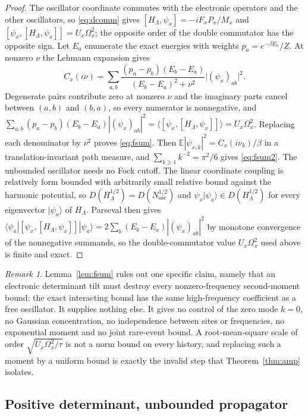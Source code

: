 \documentclass[11pt]{article}
\theoremstyle{definition}
\theoremstyle{remark}
\newtheorem{remark}[theorem]{Remark}
\newcommand{\E}{\mathbb{E}}
\begin{document}
\begin{proof}
The oscillator coordinate commutes with the electronic operators and the other
oscillators, so \eqref{eq:dcomm} gives $[H_\Lambda,\psi_x]=-iF_xP_x/M_x$ and
$[\psi_x,[H_\Lambda,\psi_x]]=U_x\Omega_x^2$; the opposite order of the double
commutator has the opposite sign. Let $E_a$ enumerate the exact energies with weights
$p_a=e^{-\beta E_a}/Z$. At nonzero $\nu$ the Lehmann expansion gives
\begin{equation}
C_x(i\nu)=\sum_{a,b}\frac{(p_a-p_b)(E_b-E_a)}{(E_b-E_a)^2+\nu^2}
\bigl|(\psi_x)_{ab}\bigr|^2 .
\label{eq:lehmann}
\end{equation}
Degenerate pairs contribute zero at nonzero $\nu$ and the imaginary parts cancel
between $(a,b)$ and $(b,a)$, so every numerator is nonnegative, and
$\sum_{a,b}(p_a-p_b)(E_b-E_a)|(\psi_x)_{ab}|^2
=\langle[\psi_x,[H_\Lambda,\psi_x]]\rangle=U_x\Omega_x^2$. Replacing each denominator
by $\nu^2$ proves \eqref{eq:fsum}. Then
$\E|\psi_{x,k}|^2=C_x(i\nu_k)/\beta$ in a translation-invariant path measure, and
$\sum_{k\ge1}k^{-2}=\pi^2/6$ gives \eqref{eq:fsum2}. The unbounded oscillator needs no
Fock cutoff. The linear coordinate coupling is relatively form bounded with
arbitrarily small relative bound against the harmonic potential, so
$D(H_\Lambda^{1/2})=D(N_{\mathrm{osc}}^{1/2})$ and $\psi_x|\psi_a\rangle\in
D(H_\Lambda^{1/2})$ for every eigenvector $|\psi_a\rangle$ of $H_\Lambda$. Parseval
then gives
$\langle\psi_a|[\psi_x,[H_\Lambda,\psi_x]]|\psi_a\rangle
=2\sum_b(E_b-E_a)|(\psi_x)_{ab}|^2$ by monotone convergence of the nonnegative
summands, so the double-commutator value $U_x\Omega_x^2$ used above is finite and
exact.
\end{proof}

\begin{remark}
Lemma~\ref{lem:fsum} rules out one specific claim, namely that an electronic
determinant tilt must destroy every nonzero-frequency second-moment bound: the exact
interacting bound has the same high-frequency coefficient as a free oscillator. It
supplies nothing else. It gives no control of the zero mode $k=0$, no Gaussian
concentration, no independence between sites or frequencies, no exponential moment
and no joint rare-event bound. A root-mean-square scale of order
$\sqrt{U_x\Omega_x^2/\tau}$ is not a norm bound on every history, and replacing such a
moment by a uniform bound is exactly the invalid step that
Theorem~\ref{thm:amp} isolates.
\end{remark}

\subsection{Positive determinant, unbounded propagator}
\end{document}

